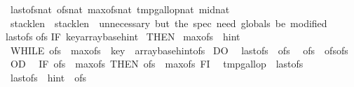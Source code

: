 \begin{isabellebody}
\ last{\isacharunderscore}ofs{\isacharcolon}{\isacharcolon}nat\ ofs{\isacharcolon}{\isacharcolon}nat\ max{\isacharunderscore}ofs{\isacharcolon}{\isacharcolon}nat\ tmp{\isacharunderscore}gallop{\isacharcolon}{\isacharcolon}nat\ mid{\isacharcolon}{\isacharcolon}nat\ \isanewline
{\isachardoublequoteopen}\isanewline
{\isacharparenleft}{\isacharasterisk}\ {\isasymacute}stack{\isacharunderscore}len\ {\isacharcolon}{\isacharequal}{\isacharequal}\ {\isasymacute}stack{\isacharunderscore}len{\isacharsemicolon}{\isacharsemicolon}\ \ unnecessary\ but\ the\ spec\ need\ globals\ be\ modified\ {\isacharasterisk}{\isacharparenright}\isanewline
{\isasymacute}last{\isacharunderscore}ofs{\isacharcolon}{\isacharequal}{\isacharequal}{}{\isacharsemicolon}{\isacharsemicolon}\isanewline
{\isasymacute}ofs{\isacharcolon}{\isacharequal}{\isacharequal}{}{\isacharsemicolon}{\isacharsemicolon}\isanewline
IF\ {\isasymacute}key{\isacharless}{\isasymacute}array{\isacharbang}{\isacharparenleft}{\isasymacute}base{\isacharplus}{\isasymacute}hint{\isacharparenright}\ \isanewline
THEN\isanewline
\ {\isasymacute}max{\isacharunderscore}ofs\ {\isacharcolon}{\isacharequal}{\isacharequal}\ {\isasymacute}hint\ {\isacharplus}\ {}{\isacharsemicolon}{\isacharsemicolon}\isanewline
\ WHILE\ {\isacharparenleft}{\isasymacute}ofs\ {\isacharless}\ {\isasymacute}max{\isacharunderscore}ofs\ {\isacharampersand}\ {\isasymacute}key\ {\isacharless}\ {\isasymacute}array{\isacharbang}{\isacharparenleft}{\isasymacute}base{\isacharplus}{\isasymacute}hint{\isacharminus}{\isasymacute}ofs{\isacharparenright}{\isacharparenright}\isanewline
\ DO\isanewline
\ \ {\isasymacute}last{\isacharunderscore}ofs\ {\isacharcolon}{\isacharequal}{\isacharequal}\ {\isasymacute}ofs{\isacharsemicolon}{\isacharsemicolon}\isanewline
\ \ {\isasymacute}ofs\ {\isacharcolon}{\isacharequal}{\isacharequal}\ {\isasymacute}ofs{\isacharplus}{\isasymacute}ofs{\isacharplus}{}\isanewline
\ OD\ {\isacharsemicolon}{\isacharsemicolon}\isanewline
\ IF\ {\isasymacute}ofs\ {\isachargreater}\ {\isasymacute}max{\isacharunderscore}ofs\ THEN\ {\isasymacute}ofs\ {\isacharcolon}{\isacharequal}{\isacharequal}\ {\isasymacute}max{\isacharunderscore}ofs\ FI\ {\isacharsemicolon}{\isacharsemicolon}\isanewline
\ {\isasymacute}tmp{\isacharunderscore}gallop\ {\isacharcolon}{\isacharequal}{\isacharequal}\ {\isasymacute}last{\isacharunderscore}ofs{\isacharsemicolon}{\isacharsemicolon}\isanewline
\ {\isasymacute}last{\isacharunderscore}ofs\ {\isacharcolon}{\isacharequal}{\isacharequal}\ {\isasymacute}hint{\isacharplus}{}\ {\isacharminus}\ {\isasymacute}ofs{\isacharsemicolon}{\isacharsemicolon}\isanewline

\end{isabellebody}
